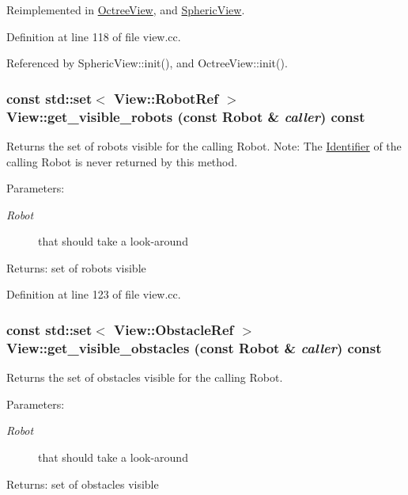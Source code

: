 Reimplemented in \hyperlink{class_octree_view_800b8d09dbd898769439f1765e7d87b1}{OctreeView}, and \hyperlink{class_spheric_view_dbd6a1d5e2f17594f82e831c38d35ec6}{SphericView}.

Definition at line 118 of file view.cc.

Referenced by SphericView::init(), and OctreeView::init().\hypertarget{class_view_10dfd4b4f63f779ca9818317b94aa00b}{
\subsubsection[get\_\-visible\_\-robots]{\setlength{\rightskip}{0pt plus 5cm}const std::set$<$ View::RobotRef $>$ View::get\_\-visible\_\-robots (const Robot \& {\em caller}) const}}
\label{class_view_10dfd4b4f63f779ca9818317b94aa00b}


Returns the set of robots visible for the calling Robot. Note: The \hyperlink{class_identifier}{Identifier} of the calling Robot is never returned by this method. \begin{Desc}
\item[Parameters:]
\begin{description}
\item[{\em Robot}]that should take a look-around \end{description}
\end{Desc}
\begin{Desc}
\item[Returns:]set of robots visible \end{Desc}


Definition at line 123 of file view.cc.\hypertarget{class_view_cfc09c1945cd9db211dbd3d202c4393c}{
\subsubsection[get\_\-visible\_\-obstacles]{\setlength{\rightskip}{0pt plus 5cm}const std::set$<$ View::ObstacleRef $>$ View::get\_\-visible\_\-obstacles (const Robot \& {\em caller}) const}}
\label{class_view_cfc09c1945cd9db211dbd3d202c4393c}


Returns the set of obstacles visible for the calling Robot. \begin{Desc}
\item[Parameters:]
\begin{description}
\item[{\em Robot}]that should take a look-around \end{description}
\end{Desc}
\begin{Desc}
\item[Returns:]set of obstacles visible \end{Desc}



